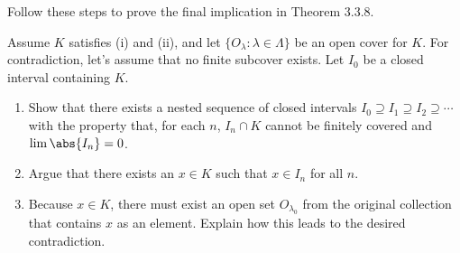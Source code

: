 \documentclass{lew98_solutions}
\begin{document}
\begin{exercise}
\label{ex:3.3.9}
    Follow these steps to prove the final implication in Theorem 3.3.8.

    Assume \( K \) satisfies (i) and (ii), and let \( \{ O_{\lambda} : \lambda \in \Lambda \} \) be an open cover for \( K \). For contradiction, let's assume that no finite subcover exists. Let \( I_0 \) be a closed interval containing \( K \).
    \begin{enumerate}
        \item Show that there exists a nested sequence of closed intervals \( I_0 \supseteq I_1 \supseteq I_2 \supseteq \cdots \) with the property that, for each \( n \), \( I_n \cap K \) cannot be finitely covered and \( \lim \abs{I_n} = 0 \).

        \item Argue that there exists an \( x \in K \) such that \( x \in I_n \) for all \( n \).

        \item Because \( x \in K \), there must exist an open set \( O_{\lambda_0} \) from the original collection that contains \( x \) as an element. Explain how this leads to the desired contradiction.
    \end{enumerate}
\end{exercise}
\end{document}
